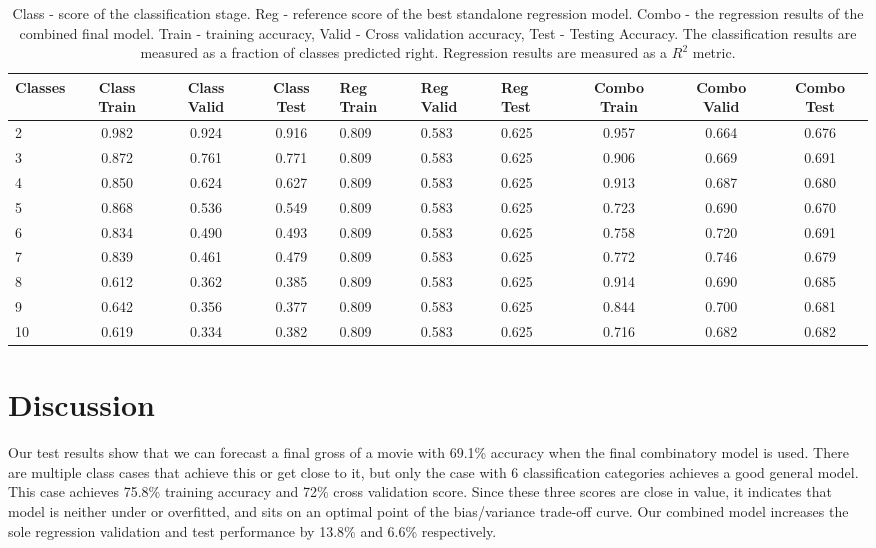 \begin{table}[!h]
\caption{Class - score of the classification stage. Reg - reference score of the best standalone regression model. Combo - the regression results of the combined final model. Train - training accuracy, Valid - Cross validation accuracy, Test - Testing Accuracy. The classification results are measured as a fraction of classes predicted right. Regression results are measured as a $R^2$ metric.}
\label{tab:top_ten_methods}
\centering
\begin{tabular}{|p{1cm}|c|c|c|p{1cm}|p{1cm}|p{1cm}|c|c|c|}
\hline
Classes&Class Train&Class Valid&Class Test&Reg Train&Reg Valid&Reg Test&Combo Train&Combo Valid&Combo Test \\
\hline
2 & 0.982 & 0.924 & 0.916 & 0.809 & 0.583 & 0.625 & 0.957 & 0.664 & 0.676 \\
3 & 0.872 & 0.761 & 0.771 & 0.809 & 0.583 & 0.625 & 0.906 & 0.669 & 0.691 \\ 
4 & 0.850 & 0.624 & 0.627 & 0.809 & 0.583 & 0.625 & 0.913 & 0.687 & 0.680 \\
5 & 0.868 & 0.536 & 0.549 & 0.809 & 0.583 & 0.625 & 0.723 & 0.690 & 0.670 \\
6 & 0.834 & 0.490 & 0.493 & 0.809 & 0.583 & 0.625 & 0.758 & 0.720 & 0.691 \\
7 & 0.839 & 0.461 & 0.479 & 0.809 & 0.583 & 0.625 & 0.772 & 0.746 & 0.679 \\
8 & 0.612 & 0.362 & 0.385 & 0.809 & 0.583 & 0.625 & 0.914 & 0.690 & 0.685 \\
9 & 0.642 & 0.356 & 0.377 & 0.809 & 0.583 & 0.625 & 0.844 & 0.700 & 0.681 \\
10 & 0.619 & 0.334 & 0.382 & 0.809 & 0.583 & 0.625 & 0.716 & 0.682 & 0.682 \\
\hline

\end{tabular}
\end{table}

\section{Discussion}
Our test results show that we can forecast a final gross of a movie with 69.1\% accuracy when the final combinatory model is used. There are multiple class cases that achieve this or get close to it, but only the case with 6 classification categories achieves a good general model. This case achieves 75.8\% training accuracy and 72\% cross validation score. Since these three scores are close in value, it indicates that model is neither under or overfitted, and sits on an optimal point of the bias/variance trade-off curve. Our combined model increases the sole regression validation and test performance by 13.8\%  and 6.6\% respectively. 

